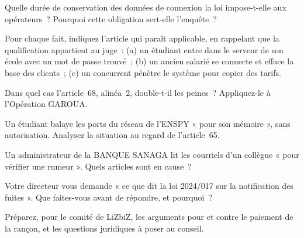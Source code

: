 \begin{boxexo}[title={\ding{45}\quad Exercice~11.2. Conserver \niveaubase}]
Quelle durée de conservation des données de connexion la loi impose-t-elle
aux opérateurs~? Pourquoi cette obligation sert-elle l'enquête~?
\end{boxexo}

\begin{boxexo}[title={\ding{45}\quad Exercice~11.3. Qualifier \niveaumoyen}]
Pour chaque fait, indiquez l'article qui paraît applicable, en rappelant
que la qualification appartient au juge~: (a) un étudiant entre dans le
serveur de son école avec un mot de passe trouvé~; (b) un ancien salarié
se connecte et efface la base des clients~; (c) un concurrent pénètre le
système pour copier des tarifs.
\end{boxexo}

\begin{boxexo}[title={\ding{45}\quad Exercice~11.4. Doubler la peine \niveaumoyen}]
Dans quel cas l'article~68, alinéa~2, double-t-il les peines~? Appliquez-le
à l'Opération GAROUA.
\end{boxexo}

\begin{boxexo}[title={\ding{45}\quad Exercice~11.5. Le test non autorisé \niveaumoyen}]
Un étudiant balaye les ports du réseau de l'ENSPY « pour son mémoire »,
sans autorisation. Analysez la situation au regard de l'article~65.
\end{boxexo}

\begin{boxexo}[title={\ding{45}\quad Exercice~11.6. Confidentialité \niveaumoyen}]
Un administrateur de la BANQUE SANAGA lit les courriels d'un collègue
« pour vérifier une rumeur ». Quels articles sont en cause~?
\end{boxexo}

\begin{boxexo}[title={\ding{45}\quad Exercice~11.7. Avant d'appliquer \niveaumoyen}]
Votre directeur vous demande « ce que dit la loi 2024/017 sur la
notification des fuites ». Que faites-vous avant de répondre, et pourquoi~?
\end{boxexo}

\begin{boxexo}[title={\ding{45}\quad Exercice~11.8. La rançon \niveaumoyen}]
Préparez, pour le comité de LiZbiZ, les arguments pour et contre le
paiement de la rançon, et les questions juridiques à poser au conseil.
\end{boxexo}

